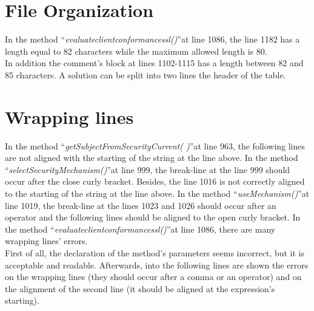 \documentclass[\mainpath/main]{subfiles}
\begin{document}
\section{File Organization}
\label{CodeInspectionChecklist:FileOrganization}
In the method \textquotedblleft \textit{evaluate\textunderscore client\textunderscore conformance\textunderscore ssl(\textellipsis)}\textquotedblright at line 1086, the line 1182 has a length equal to 82 characters while the maximum allowed length is 80.\\
In addition the comment's block at lines 1102-1115 has a length between 82 and 85 characters. A solution can be split into two lines the header of the table.

\section{Wrapping lines}
\label{CodeInspectionChecklist:WrappingLines}
In the method \textquotedblleft \textit{getSubjectFromSecurityCurrent( )}\textquotedblright at line 963, the following lines are not aligned with the starting of the string at the line above.
In the method \textquotedblleft \textit{selectSecurityMechanism(\textellipsis)}\textquotedblright at line 999, the break-line at the line 999 should occur after the close curly bracket.
Besides, the line 1016 is not correctly aligned to the starting of the string at the line above.
In the method \textquotedblleft \textit{useMechanism(\textellipsis)}\textquotedblright at line 1019, the break-line at the lines 1023 and 1026 should occur after an operator and the following lines should be aligned to the open curly bracket.
In the method \textquotedblleft \textit{evaluate\textunderscore client\textunderscore conformance\textunderscore ssl(\textellipsis)}\textquotedblright at line 1086, there are many wrapping lines' errors.\\
First of all, the declaration of the method's parameters seems incorrect, but it is acceptable and readable. Afterwards, into the following lines are shown the errors on the wrapping lines (they should occur after a comma or an operator) and on the alignment of the second line (it should be aligned at the expression's starting).
\end{document}
